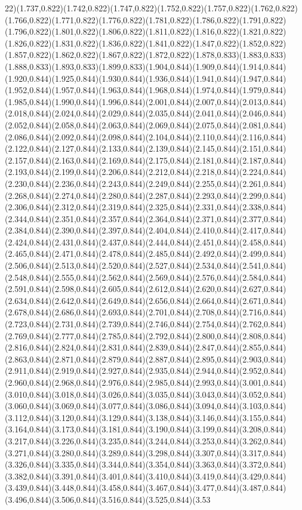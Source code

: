 \documentclass[smallextended]{svjour3}
\begin{document}
22)(1.737,0.822)(1.742,0.822)(1.747,0.822)(1.752,0.822)(1.757,0.822)(1.762,0.822)(1.766,0.822)(1.771,0.822)(1.776,0.822)(1.781,0.822)(1.786,0.822)(1.791,0.822)(1.796,0.822)(1.801,0.822)(1.806,0.822)(1.811,0.822)(1.816,0.822)(1.821,0.822)(1.826,0.822)(1.831,0.822)(1.836,0.822)(1.841,0.822)(1.847,0.822)(1.852,0.822)(1.857,0.822)(1.862,0.822)(1.867,0.822)(1.872,0.822)(1.878,0.833)(1.883,0.833)(1.888,0.833)(1.893,0.833)(1.899,0.833)(1.904,0.844)(1.909,0.844)(1.914,0.844)(1.920,0.844)(1.925,0.844)(1.930,0.844)(1.936,0.844)(1.941,0.844)(1.947,0.844)(1.952,0.844)(1.957,0.844)(1.963,0.844)(1.968,0.844)(1.974,0.844)(1.979,0.844)(1.985,0.844)(1.990,0.844)(1.996,0.844)(2.001,0.844)(2.007,0.844)(2.013,0.844)(2.018,0.844)(2.024,0.844)(2.029,0.844)(2.035,0.844)(2.041,0.844)(2.046,0.844)(2.052,0.844)(2.058,0.844)(2.063,0.844)(2.069,0.844)(2.075,0.844)(2.081,0.844)(2.086,0.844)(2.092,0.844)(2.098,0.844)(2.104,0.844)(2.110,0.844)(2.116,0.844)(2.122,0.844)(2.127,0.844)(2.133,0.844)(2.139,0.844)(2.145,0.844)(2.151,0.844)(2.157,0.844)(2.163,0.844)(2.169,0.844)(2.175,0.844)(2.181,0.844)(2.187,0.844)(2.193,0.844)(2.199,0.844)(2.206,0.844)(2.212,0.844)(2.218,0.844)(2.224,0.844)(2.230,0.844)(2.236,0.844)(2.243,0.844)(2.249,0.844)(2.255,0.844)(2.261,0.844)(2.268,0.844)(2.274,0.844)(2.280,0.844)(2.287,0.844)(2.293,0.844)(2.299,0.844)(2.306,0.844)(2.312,0.844)(2.319,0.844)(2.325,0.844)(2.331,0.844)(2.338,0.844)(2.344,0.844)(2.351,0.844)(2.357,0.844)(2.364,0.844)(2.371,0.844)(2.377,0.844)(2.384,0.844)(2.390,0.844)(2.397,0.844)(2.404,0.844)(2.410,0.844)(2.417,0.844)(2.424,0.844)(2.431,0.844)(2.437,0.844)(2.444,0.844)(2.451,0.844)(2.458,0.844)(2.465,0.844)(2.471,0.844)(2.478,0.844)(2.485,0.844)(2.492,0.844)(2.499,0.844)(2.506,0.844)(2.513,0.844)(2.520,0.844)(2.527,0.844)(2.534,0.844)(2.541,0.844)(2.548,0.844)(2.555,0.844)(2.562,0.844)(2.569,0.844)(2.576,0.844)(2.584,0.844)(2.591,0.844)(2.598,0.844)(2.605,0.844)(2.612,0.844)(2.620,0.844)(2.627,0.844)(2.634,0.844)(2.642,0.844)(2.649,0.844)(2.656,0.844)(2.664,0.844)(2.671,0.844)(2.678,0.844)(2.686,0.844)(2.693,0.844)(2.701,0.844)(2.708,0.844)(2.716,0.844)(2.723,0.844)(2.731,0.844)(2.739,0.844)(2.746,0.844)(2.754,0.844)(2.762,0.844)(2.769,0.844)(2.777,0.844)(2.785,0.844)(2.792,0.844)(2.800,0.844)(2.808,0.844)(2.816,0.844)(2.824,0.844)(2.831,0.844)(2.839,0.844)(2.847,0.844)(2.855,0.844)(2.863,0.844)(2.871,0.844)(2.879,0.844)(2.887,0.844)(2.895,0.844)(2.903,0.844)(2.911,0.844)(2.919,0.844)(2.927,0.844)(2.935,0.844)(2.944,0.844)(2.952,0.844)(2.960,0.844)(2.968,0.844)(2.976,0.844)(2.985,0.844)(2.993,0.844)(3.001,0.844)(3.010,0.844)(3.018,0.844)(3.026,0.844)(3.035,0.844)(3.043,0.844)(3.052,0.844)(3.060,0.844)(3.069,0.844)(3.077,0.844)(3.086,0.844)(3.094,0.844)(3.103,0.844)(3.112,0.844)(3.120,0.844)(3.129,0.844)(3.138,0.844)(3.146,0.844)(3.155,0.844)(3.164,0.844)(3.173,0.844)(3.181,0.844)(3.190,0.844)(3.199,0.844)(3.208,0.844)(3.217,0.844)(3.226,0.844)(3.235,0.844)(3.244,0.844)(3.253,0.844)(3.262,0.844)(3.271,0.844)(3.280,0.844)(3.289,0.844)(3.298,0.844)(3.307,0.844)(3.317,0.844)(3.326,0.844)(3.335,0.844)(3.344,0.844)(3.354,0.844)(3.363,0.844)(3.372,0.844)(3.382,0.844)(3.391,0.844)(3.401,0.844)(3.410,0.844)(3.419,0.844)(3.429,0.844)(3.439,0.844)(3.448,0.844)(3.458,0.844)(3.467,0.844)(3.477,0.844)(3.487,0.844)(3.496,0.844)(3.506,0.844)(3.516,0.844)(3.525,0.844)(3.53
\end{document}
